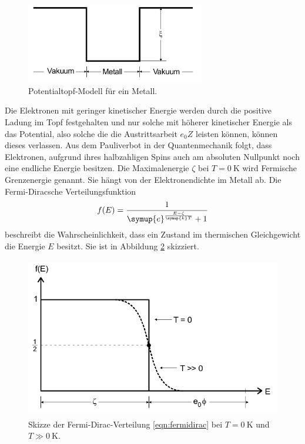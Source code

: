 \begin{figure}
  \centering
  \includegraphics[height=3.5cm]{SommerAlbum15/PoTopf.png}
  \caption{Potentialtopf-Modell für ein Metall.\cite{anleitung}}
  \label{fig:TOPF}
\end{figure}

\FloatBarrier

Die Elektronen mit geringer kinetischer Energie
werden durch die positive Ladung im Topf festgehalten und nur solche mit
höherer kinetischer Energie als das Potential, also solche die die
Austrittsarbeit $e_0 Z$ leisten können, können dieses verlassen.
Aus dem Pauliverbot in der Quantenmechanik folgt, dass Elektronen, aufgrund
ihres halbzahligen Spins auch am absoluten Nullpunkt noch eine endliche
Energie besitzen. Die Maximalenergie $\zeta$ bei $T = \SI{0}{\kelvin}$ wird
Fermische Grenzenergie genannt. Sie hängt von der Elektronendichte im Metall ab.
Die Fermi-Diracsche Verteilungsfunktion
\begin{align}
  f(E) = \frac{1}{\symup{e}^{\frac{E-\zeta}{\symup{k}T}} + 1}
  \label{eqn:fermidirac}
\end{align}
beschreibt die Wahrscheinlichkeit, dass ein Zustand im thermischen
Gleichgewicht die Energie $E$ besitzt.
Sie ist in Abbildung \ref{fig:FermiDirac} skizziert.

\begin{figure}
  \centering
  \includegraphics[height=7cm]{SommerAlbum15/FermiDirac.png}
  \caption{Skizze der Fermi-Dirac-Verteilung \eqref{eqn:fermidirac} bei
  $T = \SI{0}{\kelvin}$ und $T \gg \SI{0}{\kelvin}$.\cite{anleitung}}
  \label{fig:FermiDirac}
\end{figure}

